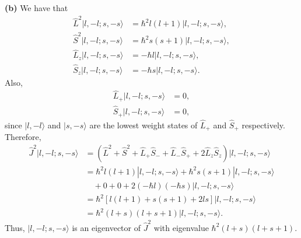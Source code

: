 \documentclass{article}
\begin{document}
\textbf{(b)} 
We have that
\begin{align*}
\hat{L}^2 |l, -l; s, -s\rangle &= \hbar^2 l(l+1) |l, -l; s, -s\rangle, \\
\hat{S}^2 |l, -l; s, -s\rangle &= \hbar^2 s(s+1) |l, -l; s, -s\rangle, \\
\hat{L}_z |l, -l; s, -s\rangle &= -\hbar l |l, -l; s, -s\rangle, \\
\hat{S}_z |l, -l; s, -s\rangle &= -\hbar s |l, -l; s, -s\rangle.
\end{align*}
Also,
\begin{align*}
\hat{L}_+ |l, -l; s, -s\rangle &= 0, \\
\hat{S}_+ |l, -l; s, -s\rangle &= 0,
\end{align*}
since $|l, -l\rangle$ and $|s, -s\rangle$ are the lowest weight states of $\hat{L}_+$ and $\hat{S}_+$ respectively.  Therefore,
\begin{align*}
\hat{J}^2 |l, -l; s, -s\rangle &= (\hat{L}^2 + \hat{S}^2 + \hat{L}_+ \hat{S}_- + \hat{L}_- \hat{S}_+ + 2 \hat{L}_z \hat{S}_z) |l, -l; s, -s\rangle \\
&= \hbar^2 l(l+1) |l, -l; s, -s\rangle + \hbar^2 s(s+1) |l, -l; s, -s\rangle \\
&\quad + 0 + 0 + 2 (-\hbar l)(-\hbar s) |l, -l; s, -s\rangle \\
&= \hbar^2 [l(l+1) + s(s+1) + 2ls] |l, -l; s, -s\rangle \\
&= \hbar^2 (l+s)(l+s+1) |l, -l; s, -s\rangle.
\end{align*}
Thus, $|l, -l; s, -s\rangle$ is an eigenvector of $\hat{J}^2$ with eigenvalue $\hbar^2 (l+s)(l+s+1)$.
\end{document}
